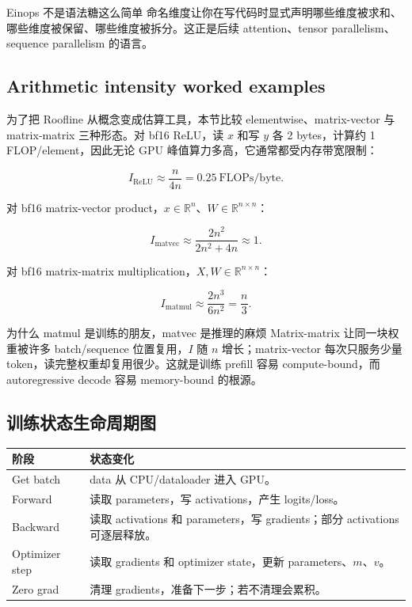 \begin{warningbox}{Einops 不是语法糖这么简单}
命名维度让你在写代码时显式声明哪些维度被求和、哪些维度被保留、哪些维度被拆分。这正是后续 attention、tensor parallelism、sequence parallelism 的语言。
\end{warningbox}

\subsection{Arithmetic intensity worked examples}

为了把 Roofline 从概念变成估算工具，本节比较 elementwise、matrix-vector 与 matrix-matrix 三种形态。对 bf16 ReLU，读 \(x\) 和写 \(y\) 各 2 bytes，计算约 1 FLOP/element，因此无论 GPU 峰值算力多高，它通常都受内存带宽限制：

\[
I_{\mathrm{ReLU}}\approx \frac{n}{4n}=0.25\ \text{FLOPs/byte}.
\]

对 bf16 matrix-vector product，\(x\in\mathbb{R}^n\)、\(W\in\mathbb{R}^{n\times n}\)：

\[
I_{\mathrm{matvec}}
\approx
\frac{2n^2}{2n^2+4n}
\approx 1.
\]

对 bf16 matrix-matrix multiplication，\(X,W\in\mathbb{R}^{n\times n}\)：

\[
I_{\mathrm{matmul}}
\approx
\frac{2n^3}{6n^2}
=\frac{n}{3}.
\]

\begin{importantbox}{为什么 matmul 是训练的朋友，matvec 是推理的麻烦}
Matrix-matrix 让同一块权重被许多 batch/sequence 位置复用，\(I\) 随 \(n\) 增长；matrix-vector 每次只服务少量 token，读完整权重却复用很少。这就是训练 prefill 容易 compute-bound，而 autoregressive decode 容易 memory-bound 的根源。
\end{importantbox}

\subsection{训练状态生命周期图}

\begin{center}
\begin{tabular}{p{}p{}}
\toprule
\textbf{阶段} & \textbf{状态变化} \\
\midrule
Get batch & data 从 CPU/dataloader 进入 GPU。 \\
Forward & 读取 parameters，写 activations，产生 logits/loss。 \\
Backward & 读取 activations 和 parameters，写 gradients；部分 activations 可逐层释放。 \\
Optimizer step & 读取 gradients 和 optimizer state，更新 parameters、\(m\)、\(v\)。 \\
Zero grad & 清理 gradients，准备下一步；若不清理会累积。 \\
\bottomrule
\end{tabular}
\end{center}

